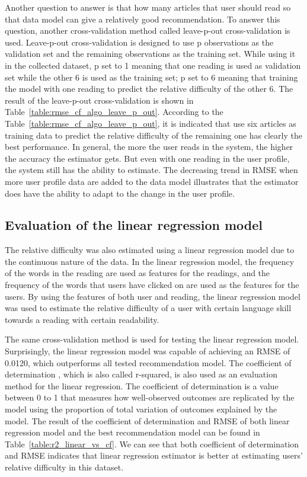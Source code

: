 Another question to answer is that how many articles that user should read so that data model can give a relatively good recommendation. To answer this question, another cross-validation method called leave-p-out cross-validation is used. Leave-p-out cross-validation is designed to use p observations as the validation set and the remaining observations as the training set. While using it in the collected dataset, p set to 1 meaning that one reading is used as validation set while the other 6 is used as the training set; p set to 6 meaning that training the model with one reading to predict the relative difficulty of the other 6. The result of the leave-p-out cross-validation is shown in Table~\ref{table:rmse_cf_algo_leave_p_out}. According to the Table~\ref{table:rmse_cf_algo_leave_p_out}, it is indicated that use six articles as training data to predict the relative difficulty of the remaining one has clearly the best performance. In general, the more the user reads in the system, the higher the accuracy the estimator gets. But even with one reading in the user profile, the system still has the ability to estimate. The decreasing trend in RMSE when more user profile data are added to the data model illustrates that the estimator does have the ability to adapt to the change in the user profile.

\subsection{Evaluation of the linear regression model}

The relative difficulty was also estimated using a linear regression model due to the continuous nature of the data. In the linear regression model, the frequency of the words in the reading are used as features for the readings, and the frequency of the words that users have clicked on are used as the features for the users. By using the features of both user and reading, the linear regression model was used to estimate the relative difficulty of a user with certain language skill towards a reading with certain readability. 

The same cross-validation method is used for testing the linear regression model. Surprisingly, the linear regression model was capable of achieving an RMSE of 0.0120, which outperforms all tested recommendation model. The coefficient of determination \cite{Glantz1990}, which is also called r-squared, is also used as an evaluation method for the linear regression. The coefficient of determination is a value between 0 to 1 that measures how well-observed outcomes are replicated by the model using the proportion of total variation of outcomes explained by the model. The result of the coefficient of determination and RMSE of both linear regression model and the best recommendation model can be found in Table~\ref{table:r2_linear_vs_cf}. We can see that both coefficient of determination and RMSE indicates that linear regression estimator is better at estimating users' relative difficulty in this dataset. 

